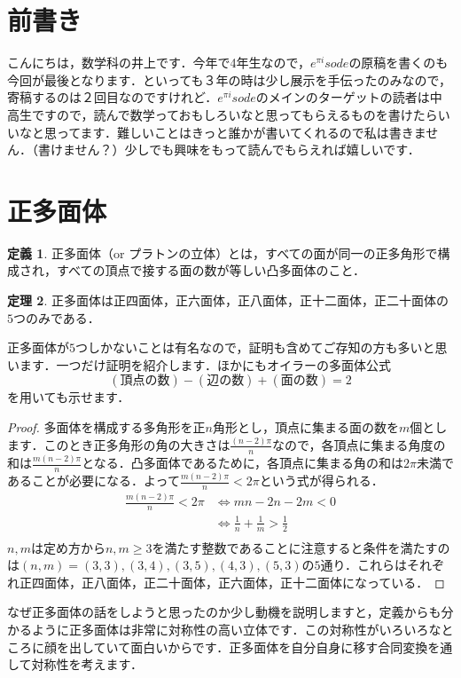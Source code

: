 \documentclass[/main]{subfiles} %
\theoremstyle{definition} %
\newtheorem{idefi}{定義}[section]
\newtheorem{ithm}[idefi]{定理}
\begin{document}
\section{前書き}
こんにちは，数学科の井上です．今年で4年生なので，$e^{\pi i}sode$の原稿を書くのも今回が最後となります．といっても３年の時は少し展示を手伝ったのみなので，寄稿するのは２回目なのですけれど．$e^{\pi i}sode$のメインのターゲットの読者は中高生ですので，読んで数学っておもしろいなと思ってもらえるものを書けたらいいなと思ってます．難しいことはきっと誰かが書いてくれるので私は書きません．（書けません？）少しでも興味をもって読んでもらえれば嬉しいです．%

\section{正多面体}
\begin{idefi}
  正多面体（or プラトンの立体）とは，すべての面が同一の正多角形で構成され，すべての頂点で接する面の数が等しい凸多面体のこと．
\end{idefi}
\begin{ithm}
  正多面体は正四面体，正六面体，正八面体，正十二面体，正二十面体の$5$つのみである．
\end{ithm}
正多面体が$5$つしかないことは有名なので，証明も含めてご存知の方も多いと思います．一つだけ証明を紹介します．ほかにもオイラーの多面体公式
\[(頂点の数)-(\text{辺の数})+(\text{面の数})=2\] %
を用いても示せます．
\begin{proof}
  多面体を構成する多角形を正$n$角形とし，頂点に集まる面の数を$m$個とします．このとき正多角形の角の大きさは$\frac{(n-2)\pi}{n}$なので，各頂点に集まる角度の和は$\frac{m(n-2)\pi}{n}$となる．凸多面体であるために，各頂点に集まる角の和は$2\pi$未満であることが必要になる．よって$\frac{m(n-2)\pi}{n}<2\pi$という式が得られる．
    \begin{align*}
      \frac{m(n-2)\pi}{n}<2\pi & \Longleftrightarrow mn-2n-2m<0 \\
                               & \Longleftrightarrow  \frac{1}{n}+\frac{1}{m}>\frac{1}{2}\\
    \end{align*}
  $n,m$は定め方から$n,m\geq3$を満たす整数であることに注意すると条件を満たすのは$(n,m)=(3,3),(3,4),(3,5),(4,3),(5,3)$の$5$通り．これらはそれぞれ正四面体，正八面体，正二十面体，正六面体，正十二面体になっている．
\end{proof}
なぜ正多面体の話をしようと思ったのか少し動機を説明しますと，定義からも分かるように正多面体は非常に対称性の高い立体です．この対称性がいろいろなところに顔を出していて面白いからです．正多面体を自分自身に移す合同変換を通して対称性を考えます．
\end{document}
